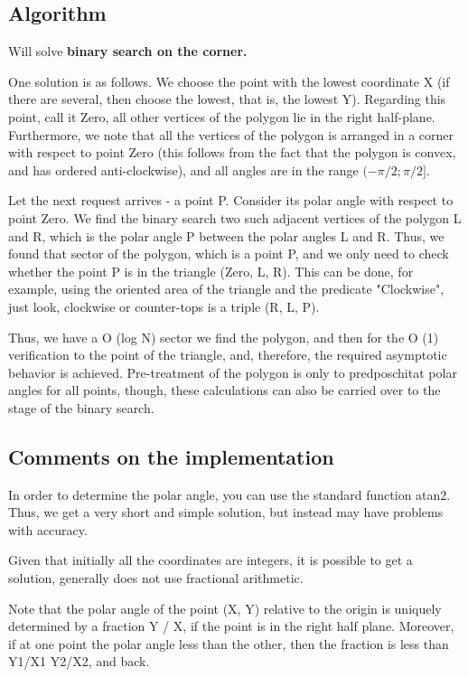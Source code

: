 \subsection{ Algorithm }
Will solve \textbf{binary search on the corner.}

One solution is as follows. We choose the point with the lowest coordinate X (if there are several, then choose the lowest, that is, the lowest Y). Regarding this point, call it Zero, all other vertices of the polygon lie in the right half-plane. Furthermore, we note that all the vertices of the polygon is arranged in a corner with respect to point Zero (this follows from the fact that the polygon is convex, and has ordered anti-clockwise), and all angles are in the range $(-\pi/2;\pi/2]$.

Let the next request arrives - a point P. Consider its polar angle with respect to point Zero. We find the binary search two such adjacent vertices of the polygon L and R, which is the polar angle P between the polar angles L and R. Thus, we found that sector of the polygon, which is a point P, and we only need to check whether the point P is in the triangle (Zero, L, R). This can be done, for example, using the oriented area of the triangle and the predicate "Clockwise", just look, clockwise or counter-tops is a triple (R, L, P).

Thus, we have a O (log N) sector we find the polygon, and then for the O (1) verification to the point of the triangle, and, therefore, the required asymptotic behavior is achieved. Pre-treatment of the polygon is only to predposchitat polar angles for all points, though, these calculations can also be carried over to the stage of the binary search.

\subsection{ Comments on the implementation }
In order to determine the polar angle, you can use the standard function atan2. Thus, we get a very short and simple solution, but instead may have problems with accuracy.

Given that initially all the coordinates are integers, it is possible to get a solution, generally does not use fractional arithmetic.

Note that the polar angle of the point (X, Y) relative to the origin is uniquely determined by a fraction Y / X, if the point is in the right half plane. Moreover, if at one point the polar angle less than the other, then the fraction is less than Y1/X1 Y2/X2, and back.

